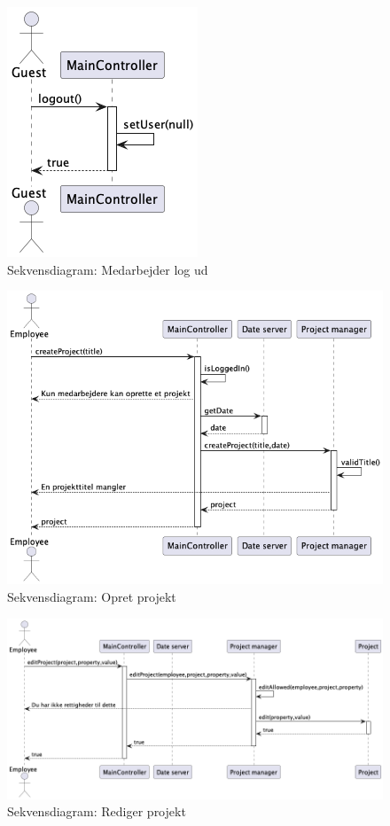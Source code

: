 \begin{figure}[H]
    \centering
    \caption{Sekvensdiagram: Medarbejder log ud}\label{fig:sequence_logout}
    \includegraphics[width = .25\textwidth]{Diagrams/seq_logout.png}
\end{figure}
\begin{figure}[H]
    \centering
    \caption{Sekvensdiagram: Opret projekt}\label{fig:sequence_create_project}
    \includegraphics[width = .75\textwidth]{Diagrams/seq_create_project.png}
\end{figure}
\begin{figure}[H]
    \centering
    \caption{Sekvensdiagram: Rediger projekt}\label{fig:sequence_project_edit}
    \includegraphics[width = .75\textwidth]{Diagrams/seq_project_edit.png}
\end{figure}
